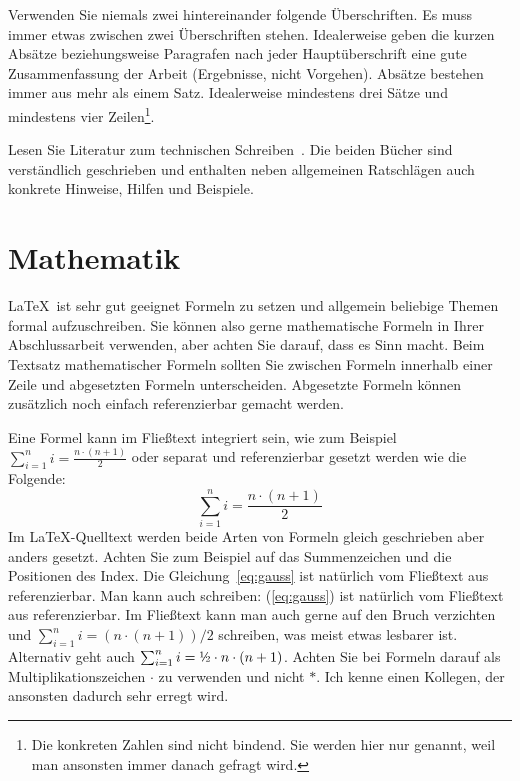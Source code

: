 \documentclass[11pt,a4paper]{report}
\begin{document}
Verwenden Sie niemals zwei hintereinander folgende Überschriften.
Es muss immer etwas zwischen zwei Überschriften stehen. 
Idealerweise geben die kurzen Absätze beziehungsweise Paragrafen 
nach jeder Hauptüberschrift eine gute Zusammenfassung der Arbeit 
(Ergebnisse, nicht Vorgehen).
Absätze bestehen immer aus mehr als einem Satz. 
Idealerweise mindestens drei Sätze und mindestens vier 
Zeilen\footnote{
Die konkreten Zahlen sind nicht bindend. 
Sie werden hier nur genannt, weil man ansonsten immer 
danach gefragt wird. 
}.

Lesen Sie Literatur zum technischen Schreiben~\cite{gockel,rechenberg}.
Die beiden Bücher sind verständlich geschrieben und enthalten
neben allgemeinen Ratschlägen auch konkrete Hinweise, Hilfen und
Beispiele.


\section{Mathematik} \label{sec:mathematik}

\LaTeX\ ist sehr gut geeignet Formeln zu setzen und 
allgemein beliebige Themen formal aufzuschreiben.
Sie können also gerne mathematische Formeln in Ihrer 
Abschlussarbeit verwenden, aber achten Sie darauf, dass
es Sinn macht. 
Beim Textsatz mathematischer Formeln sollten Sie zwischen 
Formeln innerhalb einer Zeile und abgesetzten Formeln unterscheiden. 
Abgesetzte Formeln können zusätzlich noch einfach referenzierbar
gemacht werden.

Eine Formel kann im Fließtext integriert sein, wie zum Beispiel 
$\sum_{i=1}^n i = \frac{n \cdot (n+1)}{2}$ oder separat
und referenzierbar gesetzt werden wie die Folgende:
\begin{equation} \label{eq:gauss}
  \sum_{i=1}^n i = \frac{n \cdot (n+1)}{2}
\end{equation}
Im \LaTeX-Quelltext werden beide Arten von Formeln gleich geschrieben 
aber anders gesetzt. 
Achten Sie zum Beispiel auf das Summenzeichen und die Positionen 
des Index. 
Die Gleichung~\ref{eq:gauss} ist natürlich vom Fließtext aus referenzierbar.
Man kann auch schreiben: 
(\ref{eq:gauss}) ist natürlich vom Fließtext aus referenzierbar.
Im Fließtext kann man auch gerne auf den Bruch verzichten und 
$\sum_{i=1}^n i = (n \cdot (n+1))/2$
schreiben, was meist etwas lesbarer ist.
Alternativ geht auch 
$\sum_{i=1}^n i = \mbox{\textonehalf} \cdot n \cdot (n+1)$.
Achten Sie bei Formeln darauf als Multiplikationszeichen 
$\cdot$ zu verwenden und nicht $*$. 
Ich kenne einen Kollegen, der ansonsten dadurch sehr erregt wird. 
\end{document}
